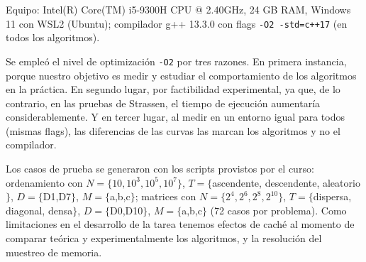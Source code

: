 Equipo: Intel(R) Core(TM) i5-9300H CPU @ 2.40GHz, 24 GB RAM, Windows 11 con WSL2 (Ubuntu); compilador
g++ 13.3.0 con flags \texttt{-O2 -std=c++17} (en todos los algoritmos). 

Se empleó el nivel de optimización \texttt{-O2} por tres razones. En primera instancia, porque nuestro objetivo
es medir y estudiar el comportamiento de los algoritmos en la práctica. En segundo lugar, por factibilidad experimental, ya que, de lo contrario,
en las pruebas de Strassen, el tiempo de ejecución aumentaría considerablemente. Y en tercer lugar, al medir en un
entorno igual para todos (mismas flags), las diferencias de las curvas las marcan los algoritmos y no el compilador.

Los casos de prueba se generaron con los scripts provistos por el
curso: ordenamiento con $N=\{10,10^3,10^5,10^7\}$, $T=\{$ascendente,
descendente, aleatorio$\}$, $D=\{$D1,D7$\}$, $M=\{$a,b,c$\}$; matrices con
$N=\{2^4,2^6,2^8,2^{10}\}$, $T=\{$dispersa, diagonal, densa$\}$,
$D=\{$D0,D10$\}$, $M=\{$a,b,c$\}$ (72 casos por problema). Como limitaciones en
el desarrollo de la tarea tenemos efectos de caché al momento de comparar teórica y experimentalmente los
algoritmos, y la resolución del muestreo de memoria.